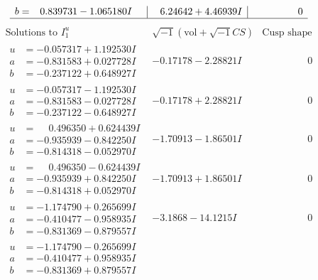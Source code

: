 \documentclass[1p]{elsarticle_modified}
\theoremstyle{definition}
\newcommand{\I}{\sqrt{-1}}
\begin{document}
$$\begin{array}{c|c|c}
\begin{aligned}
b &= \phantom{-}0.839731 - 1.065180 I\end{aligned}
 & \phantom{-}6.24642 + 4.46939 I & \phantom{-0.000000 } 0\\
 \hline 
 \end{array}$$\newpage$$\begin{array}{c|c|c}  
\text{Solutions to }I^u_{1}& \I (\text{vol} + \sqrt{-1}CS) & \text{Cusp shape}\\
 \hline 
\begin{aligned}
u &= -0.057317 + 1.192530 I \\
a &= -0.831583 + 0.027728 I \\
b &= -0.237122 + 0.648927 I\end{aligned}
 & -0.17178 - 2.28821 I & \phantom{-0.000000 } 0 \\ \hline\begin{aligned}
u &= -0.057317 - 1.192530 I \\
a &= -0.831583 - 0.027728 I \\
b &= -0.237122 - 0.648927 I\end{aligned}
 & -0.17178 + 2.28821 I & \phantom{-0.000000 } 0 \\ \hline\begin{aligned}
u &= \phantom{-}0.496350 + 0.624439 I \\
a &= -0.935939 - 0.842250 I \\
b &= -0.814318 - 0.052970 I\end{aligned}
 & -1.70913 - 1.86501 I & \phantom{-0.000000 } 0 \\ \hline\begin{aligned}
u &= \phantom{-}0.496350 - 0.624439 I \\
a &= -0.935939 + 0.842250 I \\
b &= -0.814318 + 0.052970 I\end{aligned}
 & -1.70913 + 1.86501 I & \phantom{-0.000000 } 0 \\ \hline\begin{aligned}
u &= -1.174790 + 0.265699 I \\
a &= -0.410477 - 0.958935 I \\
b &= -0.831369 - 0.879557 I\end{aligned}
 & -3.1868 - 14.1215 I & \phantom{-0.000000 } 0 \\ \hline\begin{aligned}
u &= -1.174790 - 0.265699 I \\
a &= -0.410477 + 0.958935 I \\
b &= -0.831369 + 0.879557 I\end{aligned}

\end{array}$$
\end{document}
